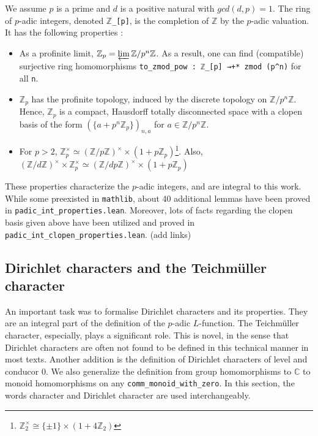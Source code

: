 \documentclass[a4paper,UKenglish,cleveref, autoref, thm-restate]{lipics-v2021}
\newcommand{\lean}[1]{\texttt{#1}\xspace} %
\begin{document}
We assume $p$ is a prime and $d$ is a positive natural with 
$gcd (d, p) = 1$. The ring of $p$-adic integers, denoted \lean{$\mathbb{Z}$\_[p]}, is the completion of $\mathbb{Z}$ by the $p$-adic
valuation. It has the following properties :
\begin{itemize}
  \item As a profinite limit, $\mathbb{Z}_p = \varprojlim \mathbb{Z} / p^n \mathbb{Z}$. As a result,
  one can find (compatible) surjective ring homomorphisms \lean{to\_zmod\_pow : ℤ\_[p] →+* zmod (p\textasciicircum n)} for all \lean{n}.
  \item $\mathbb{Z}_p$ has the profinite topology, induced by the discrete topology
  on $\mathbb{Z} / p^n \mathbb{Z}$. Hence, $\mathbb{Z}_p$ is a compact, Hausdorff totally disconnected space
  with a clopen basis of the form $( \{ a + p^n \mathbb{Z}_p \} )_{n, a}$ for $a \in \mathbb{Z} / p^n \mathbb{Z}$.
  \item For $p > 2$, $\mathbb{Z}_p^{\times} ≃ (\mathbb{Z}/p \mathbb{Z})^{\times} \times (1 + p \mathbb{Z}_p)$\footnote{$\mathbb{Z}_2^{\times} \cong \{ \pm 1 \} \times (1 + 4 \mathbb{Z}_2)$}.
  Also, $(\mathbb{Z}/d\mathbb{Z})^{\times} \times \mathbb{Z}_p^{\times} ≃
  (\mathbb{Z}/dp \mathbb{Z})^{\times} \times (1 + p \mathbb{Z}_p)$
\end{itemize}

These properties characterize the $p$-adic integers, and are integral to this work. While some preexisted in 
\lean{mathlib}, about 40 additional lemmas have been proved in \lean{padic\_int\_properties.lean}. 
Moreover, lots of facts regarding the clopen basis given above have been utilized and proved in \lean{padic\_int\_clopen\_properties.lean}. (add links)

\subsection{Dirichlet characters and the Teichmüller character}
An important task was to formalise Dirichlet characters and its properties. They are an integral part of the definition of the $p$-adic $L$-function. 
The Teichmüller character, especially, plays a significant role. This is novel, in the sense that Dirichlet characters are often not found to be defined 
in this technical manner in most texts. Another addition is the definition of Dirichlet characters of level and conducor 0. We also generalize the 
definition from group homomorphisms to $\mathbb{C}$ to monoid homomorphisms on any \lean{comm\_monoid\_with\_zero}. 
In this section, the words character and Dirichlet character are used interchangeably. 
\end{document}
